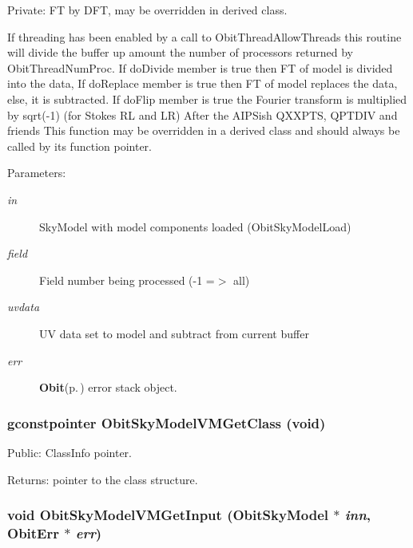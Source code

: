 Private: FT by DFT, may be overridden in derived class. 

If threading has been enabled by a call to Obit\-Thread\-Allow\-Threads this routine will divide the buffer up amount the number of processors returned by Obit\-Thread\-Num\-Proc. If do\-Divide member is true then FT of model is divided into the data, If do\-Replace member is true then FT of model replaces the data, else, it is subtracted. If do\-Flip member is true the Fourier transform is multiplied by sqrt(-1) (for Stokes RL and LR) After the AIPSish QXXPTS, QPTDIV and friends This function may be overridden in a derived class and should always be called by its function pointer. \begin{Desc}
\item[Parameters:]
\begin{description}
\item[{\em in}]Sky\-Model with model components loaded (Obit\-Sky\-Model\-Load) \item[{\em field}]Field number being processed (-1 =$>$ all) \item[{\em uvdata}]UV data set to model and subtract from current buffer \item[{\em err}]{\bf Obit}{\rm (p.\,\pageref{structObit})} error stack object. \end{description}
\end{Desc}
\subsubsection{\setlength{\rightskip}{0pt plus 5cm}gconstpointer Obit\-Sky\-Model\-VMGet\-Class (void)}\label{ObitSkyModelVM_8c_a13}


Public: Class\-Info pointer. 

\begin{Desc}
\item[Returns:]pointer to the class structure. \end{Desc}
\subsubsection{\setlength{\rightskip}{0pt plus 5cm}void Obit\-Sky\-Model\-VMGet\-Input ({\bf Obit\-Sky\-Model} $\ast$ {\em inn}, {\bf Obit\-Err} $\ast$ {\em err})}\label{ObitSkyModelVM_8c_a21}


